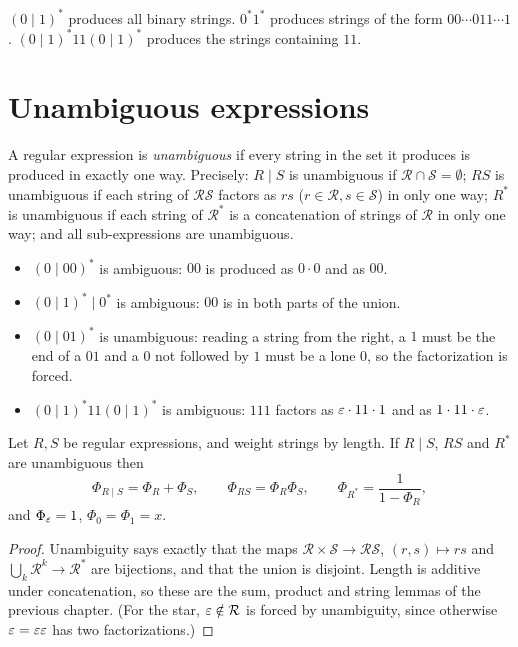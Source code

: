 \begin{example}
$(0\mid1)^*$ produces all binary strings. $0^*1^*$ produces strings of the form
$00\cdots011\cdots1$. $(0\mid 1)^*11(0\mid1)^*$ produces the strings containing $11$.
\end{example}

\section{Unambiguous expressions}

\begin{definition}[Unambiguous]
A regular expression is \emph{unambiguous} if every string in the set it produces is produced in
exactly one way. Precisely: $R \mid S$ is unambiguous if $\mathcal{R}\cap\mathcal{S} = \emptyset$;
$RS$ is unambiguous if each string of $\mathcal{R}\mathcal{S}$ factors as $rs$
($r \in \mathcal{R}, s \in \mathcal{S}$) in only one way; $R^*$ is unambiguous if each string of
$\mathcal{R}^*$ is a concatenation of strings of $\mathcal{R}$ in only one way; and all
sub-expressions are unambiguous.
\end{definition}

\begin{example}
\begin{itemize}
  \item $(0\mid 00)^*$ is ambiguous: $00$ is produced as $0\cdot0$ and as $00$.
  \item $(0\mid1)^*\mid 0^*$ is ambiguous: $00$ is in both parts of the union.
  \item $(0\mid 01)^*$ is unambiguous: reading a string from the right, a $1$ must be the end of
        a $01$ and a $0$ not followed by $1$ must be a lone $0$, so the factorization is forced.
  \item $(0\mid1)^*11(0\mid1)^*$ is ambiguous: $111$ factors as $\varepsilon\cdot11\cdot1$ and as
        $1\cdot11\cdot\varepsilon$.
\end{itemize}
\end{example}

\begin{theorem}
Let $R, S$ be regular expressions, and weight strings by length. If $R\mid S$, $RS$ and $R^*$
are unambiguous then
\[
\Phi_{R\mid S} = \Phi_R + \Phi_S,\qquad \Phi_{RS} = \Phi_R\Phi_S,\qquad
\Phi_{R^*} = \frac{1}{1 - \Phi_R},
\]
and $\Phi_\varepsilon = 1$, $\Phi_0 = \Phi_1 = x$.
\end{theorem}
\begin{proof}
Unambiguity says exactly that the maps $\mathcal{R}\times\mathcal{S}\to\mathcal{R}\mathcal{S}$,
$(r,s)\mapsto rs$ and $\bigcup_k \mathcal{R}^k \to \mathcal{R}^*$ are bijections, and that the
union is disjoint. Length is additive under concatenation, so these are the sum, product and
string lemmas of the previous chapter. (For the star, $\varepsilon \notin \mathcal{R}$ is forced by
unambiguity, since otherwise $\varepsilon = \varepsilon\varepsilon$ has two factorizations.)
\end{proof}

